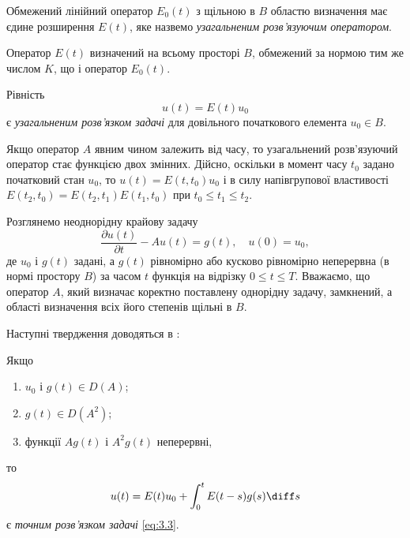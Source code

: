 \begin{definition}
    Обмежений лінійний оператор $E_0(t)$ з щільною в $B$ областю визначення має єдине розширення $E(t)$, яке назвемо \textit{узагальненим розв'язуючим оператором}.
\end{definition}

Оператор $E(t)$ визначений на всьому просторі $B$, обмежений за нормою тим же числом $K$, що і оператор $E_0(t)$. 

\begin{definition}
    Рівність 
    \begin{equation*}
        u(t) = E(t) u_0
    \end{equation*}
    є \textit{узагальненим розв'язком задачі} для довільного початкового елемента $u_0 \in B$.
\end{definition}

Якщо оператор $A$ явним чином залежить від часу, то узагальнений розв'язуючий оператор стає функцією двох змінних. Дійсно, оскільки в момент часу $t_0$ задано початковий стан $u_0$, то $u(t) = E(t, t_0) u_0$ і в силу напівгрупової властивості $E(t_2, t_0) = E(t_2, t_1) E(t_1, t_0)$ при $t_0 \le t_1 \le t_2$. \medskip

Розглянемо неоднорідну крайову задачу
\begin{equation}
    \label{eq:3.3}
    \frac{\partial u(t)}{\partial t} - A u(t) = g(t), \quad u(0) = u_0,
\end{equation}
де $u_0$ і $g(t)$ задані, а $g(t)$ рівномірно або кусково рівномірно неперервна (в  нормі простору $B$) за часом $t$ функція на відрізку $0 \le t \le T$. Вважаємо, що оператор $A$, який визначає коректно поставлену однорідну задачу, замкнений, а області визначення всіх його степенів щільні в $B$. \medskip

Наступні твердження доводяться в \cite{richtmyer1972}:
\begin{proposition}
    Якщо 
    \begin{enumerate}
        \item $u_0$ і $g(t) \in D(A)$; 
        \item $g(t) \in D(A^2)$; 
        \item функції $A g(t)$ і $A^2 g(t)$ неперервні,
    \end{enumerate}
    то 
    \begin{equation}
        \label{eq:3.4}
        u(t) = E(t) u_0 + \int_0^t E(t - s) g(s) \diff s
    \end{equation}
    є \textit{точним розв'язком задачі} \eqref{eq:3.3}.
\end{proposition}

